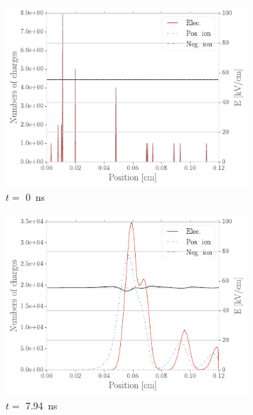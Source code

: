 	\begin{figure}[H]
		\begin{subfigure}{0.5\linewidth}
			\centering
			\includegraphics[width = .95\linewidth]{fig/chapt3/Avalanche_dev_step1.pdf}
			\caption{\label{fig:Avalanche-develop:A} $t=$ \SI{0}{ns}}
		\end{subfigure}
		\begin{subfigure}{0.5\linewidth}
			\centering
			\includegraphics[width = .95\linewidth]{fig/chapt3/Avalanche_dev_step2.pdf}
			\caption{\label{fig:Avalanche-develop:B}$t=$ \SI{7.94}{ns}}
		\end{subfigure}
		\begin{subfigure}{0.5\linewidth}
			\centering

\end{subfigure}
\end{figure}
